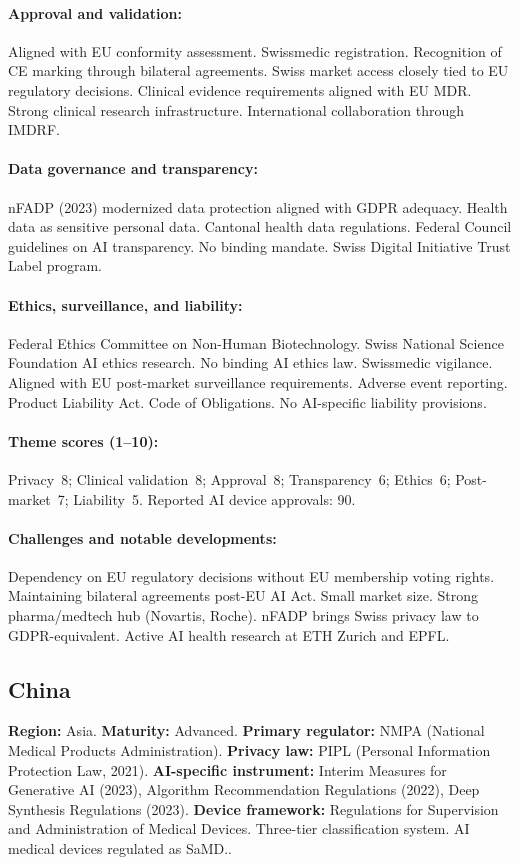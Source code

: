 {\paragraph{Approval and validation:}
Aligned with EU conformity assessment. Swissmedic registration. Recognition of CE marking through bilateral agreements. Swiss market access closely tied to EU regulatory decisions.
Clinical evidence requirements aligned with EU MDR. Strong clinical research infrastructure. International collaboration through IMDRF.

\paragraph{Data governance and transparency:}
nFADP (2023) modernized data protection aligned with GDPR adequacy. Health data as sensitive personal data. Cantonal health data regulations.
Federal Council guidelines on AI transparency. No binding mandate. Swiss Digital Initiative Trust Label program.

\paragraph{Ethics, surveillance, and liability:}
Federal Ethics Committee on Non-Human Biotechnology. Swiss National Science Foundation AI ethics research. No binding AI ethics law.
Swissmedic vigilance. Aligned with EU post-market surveillance requirements. Adverse event reporting.
Product Liability Act. Code of Obligations. No AI-specific liability provisions.

\paragraph{Theme scores (1--10):}
Privacy~8;
Clinical validation~8;
Approval~8;
Transparency~6;
Ethics~6;
Post-market~7;
Liability~5.
Reported AI device approvals: 90.

\paragraph{Challenges and notable developments:}
Dependency on EU regulatory decisions without EU membership voting rights. Maintaining bilateral agreements post-EU AI Act. Small market size.
Strong pharma/medtech hub (Novartis, Roche). nFADP brings Swiss privacy law to GDPR-equivalent. Active AI health research at ETH Zurich and EPFL.


\subsection{China}
\textbf{Region:} Asia.
\textbf{Maturity:} Advanced.
\textbf{Primary regulator:} NMPA (National Medical Products Administration).
\textbf{Privacy law:} PIPL (Personal Information Protection Law, 2021).
\textbf{AI-specific instrument:} Interim Measures for Generative AI (2023), Algorithm Recommendation Regulations (2022), Deep Synthesis Regulations (2023).
\textbf{Device framework:} Regulations for Supervision and Administration of Medical Devices. Three-tier classification system. AI medical devices regulated as SaMD..

}
